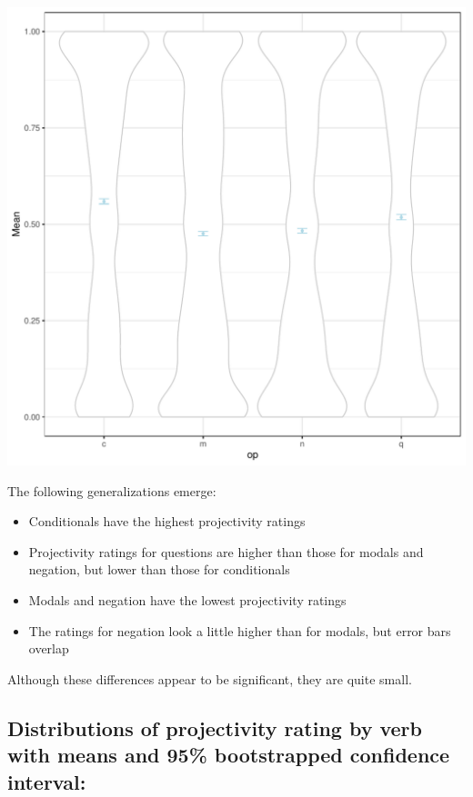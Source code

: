 \documentclass[10pt]{article}\usepackage[]{graphicx}\usepackage[dvipsnames]{xcolor}
\newenvironment{knitrout}{}{} %
\begin{document}
\begin{knitrout}
\color{fgcolor}

{\centering \includegraphics[width=.6\textwidth]{figures/summary-op-1} 

}


\end{knitrout}

\noindent The following generalizations emerge:
\begin{itemize}
  \item Conditionals have the highest projectivity ratings
  \item Projectivity ratings for questions are higher than those for modals and negation, but lower than those for conditionals
  \item Modals and negation have the lowest projectivity ratings
  \item The ratings for negation look a little higher than for modals, but error bars overlap
\end{itemize}

\noindent Although these differences appear to be significant, they are quite small.\\

\newpage
\subsection{Distributions of projectivity rating by verb with means and 95\% bootstrapped confidence interval:}
\end{document}
